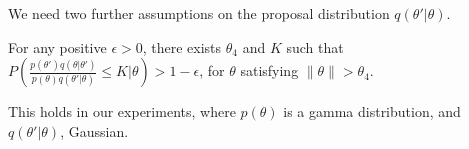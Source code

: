 

We need two further assumptions on the proposal distribution $q(\theta'|\theta)$.
\begin{assumption}
For any positive $\epsilon > 0$, there exists $\theta_4$ and $K$
such that $P(\frac{p(\theta')q(\theta|\theta')}{p(\theta)q(\theta'|\theta)} \le K | \theta) > 1 - \epsilon$,
for $\theta$ satisfying $\| \theta \|  > \theta_4$.
  \label{asmp:prior}
\end{assumption}
This holds in our experiments, where $p(\theta)$ is a gamma distribution,
and $q(\theta'|\theta)$, Gaussian.


